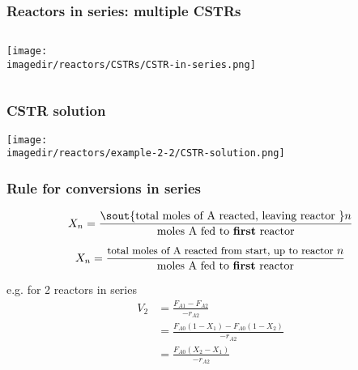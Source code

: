 
\begin{frame}\frametitle{Reactors in series: multiple CSTRs}
	\begin{columns}[t]
			\begin{center}
				\texttt{[image: \\imagedir/reactors/CSTRs/CSTR-in-series.png]}
			\end{center}
	\end{columns}
\end{frame}

\begin{frame}\frametitle{CSTR solution}
	\begin{center}
		\texttt{[image: \\imagedir/reactors/example-2-2/CSTR-solution.png]}
	\end{center}
\end{frame}

\begin{frame}\frametitle{Rule for conversions in series}
	
	\begin{exampleblock}{}
		$$X_n = \frac{\text{\sout{total moles of A reacted, leaving reactor }}n}{\text{moles A fed to \textbf{first} reactor}}$$
	\end{exampleblock}
	\vspace{-12pt}
	
	\begin{exampleblock}{}
		$$X_n = \frac{\text{\small total moles of A reacted from start, up to reactor }n}{\text{moles A fed to \textbf{first} reactor}}$$
	\end{exampleblock}
	
	\vspace{-4pt}
	e.g. for 2 reactors in series
	\begin{align*}
		V_2 &= \frac{F_{A1} - F_{A2}}{-r_{A2}}\\
			&= \frac{F_{A0}(1 - X_1) - F_{A0}(1 - X_2)}{-r_{A2}}\\
			&= \frac{F_{A0}(X_2 - X_1)}{-r_{A2}}
	\end{align*}
\end{frame}

